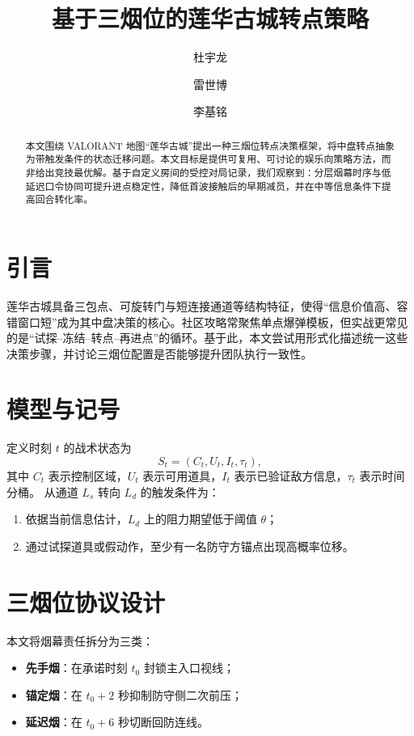 \documentclass[runningheads]{llncs}
\title{基于三烟位的莲华古城转点策略}
\author{杜宇龙 \and 雷世博 \and 李基铭}
\institute{娱乐策略研究组\\
\email{contact@example.com}}
\begin{document}
\maketitle

\begin{abstract}
本文围绕 VALORANT 地图“莲华古城”提出一种三烟位转点决策框架，将中盘转点抽象为带触发条件的状态迁移问题。本文目标是提供可复用、可讨论的娱乐向策略方法，而非给出竞技最优解。基于自定义房间的受控对局记录，我们观察到：分层烟幕时序与低延迟口令协同可提升进点稳定性，降低首波接触后的早期减员，并在中等信息条件下提高回合转化率。
\end{abstract}

\section{引言}
莲华古城具备三包点、可旋转门与短连接通道等结构特征，使得“信息价值高、容错窗口短”成为其中盘决策的核心。社区攻略常聚焦单点爆弹模板，但实战更常见的是“试探--冻结--转点--再进点”的循环。基于此，本文尝试用形式化描述统一这些决策步骤，并讨论三烟位配置是否能够提升团队执行一致性。

\section{模型与记号}
定义时刻 $t$ 的战术状态为
\[
S_t = (C_t, U_t, I_t, \tau_t),
\]
其中 $C_t$ 表示控制区域，$U_t$ 表示可用道具，$I_t$ 表示已验证敌方信息，$\tau_t$ 表示时间分桶。
从通道 $L_s$ 转向 $L_d$ 的触发条件为：
\begin{enumerate}
\item 依据当前信息估计，$L_d$ 上的阻力期望低于阈值 $\theta$；
\item 通过试探道具或假动作，至少有一名防守方锚点出现高概率位移。
\end{enumerate}

\section{三烟位协议设计}
本文将烟幕责任拆分为三类：
\begin{itemize}
\item \textbf{先手烟}：在承诺时刻 $t_0$ 封锁主入口视线；
\item \textbf{锚定烟}：在 $t_0 + 2$ 秒抑制防守侧二次前压；
\item \textbf{延迟烟}：在 $t_0 + 6$ 秒切断回防连线。
\end{itemize}
\end{document}
